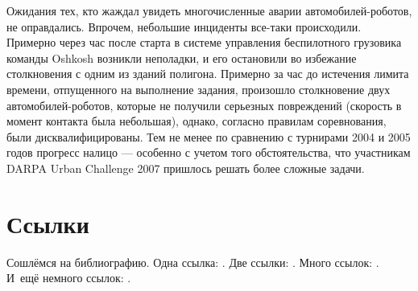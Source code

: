 Ожидания тех, кто жаждал увидеть многочисленные аварии автомобилей-роботов, 
не оправдались. Впрочем, небольшие инциденты все-таки происходили. Примерно 
через час после старта в системе управления беспилотного грузовика команды 
Oshkosh возникли неполадки, и его остановили во избежание столкновения с 
одним из зданий полигона. Примерно за час до истечения лимита времени, 
отпущенного на выполнение задания, произошло столкновение двух 
автомобилей-роботов, которые не получили серьезных повреждений 
(скорость в момент контакта была небольшая), однако, согласно правилам 
соревнования, были дисквалифицированы. Тем не менее по сравнению с турнирами 
2004 и 2005 годов прогресс налицо — особенно с учетом того обстоятельства, что 
участникам DARPA Urban Challenge 2007 пришлось решать более сложные задачи.





\section{Ссылки} \label{sect1_2}
Сошлёмся на библиографию.
Одна ссылка: \cite[с.~54]{Sokolov}\cite[с.~36]{Gaidaenko}.
Две ссылки: \cite{Sokolov,Gaidaenko}.
Много ссылок: %
\cite{Lermontov,Management,Borozda,Marketing,Constitution,FamilyCode,Gost.7.0.53,Razumovski,Lagkueva,Pokrovski,Sirotko,Lukina,Methodology,Encyclopedia,Nasirova,Berestova,Kriger}.
И~ещё немного ссылок:
\cite{Article,Book,Booklet,Conference,Inbook,Incollection,Manual,Mastersthesis,Misc,Phdthesis,Proceedings,Techreport,Unpublished}.
\cite{medvedev2006jelektronnye, CEAT:CEAT581, doi:10.1080/01932691.2010.513279,Gosele1999161,Li2007StressAnalysis, Shoji199895,test:eisner-sample,AB_patent_Pomerantz_1968,iofis_patent1960}


